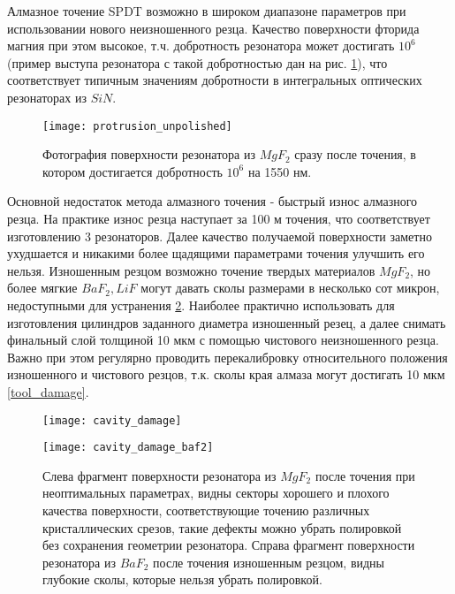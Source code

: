 Алмазное точение SPDT возможно в широком диапазоне параметров при использовании нового неизношенного резца. Качество поверхности фторида магния при этом высокое, т.ч. добротность резонатора может достигать $10^6$ (пример выступа резонатора с такой добротностью дан на рис. \ref{protrusion_unpolished}), что соответствует типичным значениям добротности в интегральных оптических резонаторах из $SiN$.

\begin{figure}[ht]
\centering
  \texttt{[image: protrusion\_unpolished]}
  \caption{Фотография поверхности резонатора из $MgF_2$ сразу после точения, в котором достигается добротность $10^6$ на 1550 нм.}
  \label{protrusion_unpolished}
\end{figure}

Основной недостаток метода алмазного точения - быстрый износ алмазного резца. На практике износ резца наступает за 100 м точения, что соответствует изготовлению 3 резонаторов. Далее качество получаемой поверхности заметно ухудшается и никакими более щадящими параметрами точения улучшить его нельзя. Изношенным резцом возможно точение твердых материалов $MgF_2$, но более мягкие $BaF_2, LiF$ могут давать сколы размерами в несколько сот микрон, недоступными для устранения \ref{cavity_damage}. Наиболее практично использовать для изготовления цилиндров заданного диаметра изношенный резец, а далее снимать финальный слой толщиной 10 мкм с помощью чистового неизношенного резца. Важно при этом регулярно проводить перекалибровку относительного положения изношенного и чистового резцов, т.к. сколы края алмаза могут достигать 10 мкм \ref{tool_damage}.

\begin{figure}[ht]
  \begin{minipage}[ht]{0.49\linewidth}\centering
    \texttt{[image: cavity\_damage]}
  \end{minipage}
  \hfill
  \begin{minipage}[ht]{0.49\linewidth}\centering
    \texttt{[image: cavity\_damage\_baf2]}
  \end{minipage}
  \caption{Слева фрагмент поверхности резонатора из $MgF_2$ после точения при неоптимальных параметрах, видны секторы хорошего и плохого качества поверхности, соответствующие точению различных кристаллических срезов, такие дефекты можно убрать полировкой без сохранения геометрии резонатора. Справа фрагмент поверхности резонатора из $BaF_2$ после точения изношенным резцом, видны глубокие сколы, которые нельзя убрать полировкой.}
  \label{cavity_damage}
\end{figure}

